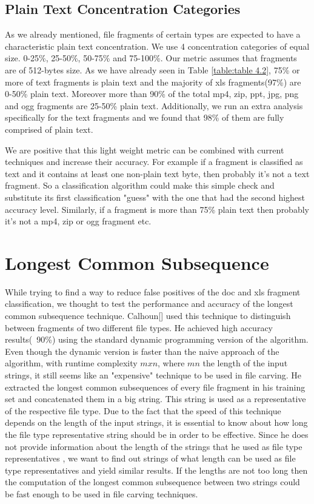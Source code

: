  \subsection{Plain Text Concentration Categories}
As we already mentioned, file fragments of certain types are expected to have a characteristic plain text concentration. We use 4 concentration categories of equal size. 0-25\%, 25-50\%, 50-75\% and 75-100\%. Our metric assumes that fragments are of 512-bytes size. As we have already seen in Table \ref{table:table 4.2}, 75\% or more of text fragments is plain text and the majority of xls fragments(97\%) are 0-50\% plain text. Moreover more than 90\% of the total mp4, zip, ppt, jpg, png and ogg fragments are 25-50\% plain text. Additionally, we run an extra analysis specifically for the text fragments and we found that 98\% of them are fully comprised of plain text.

We are positive that this light weight metric can be combined with current techniques and increase their accuracy. For example if a fragment is classified as text and it contains at least one non-plain text byte, then probably it's not a text fragment. So a classification algorithm could make this simple check and substitute its first classification "guess" with the one that had the second highest accuracy level. Similarly, if a fragment is more than 75\% plain text then probably it's not a mp4, zip or ogg fragment etc.

\section{Longest Common Subsequence}
While trying to find a way to reduce false positives of the doc and xls fragment classification, we thought to test the performance and accuracy of the longest common subsequence technique. Calhoun[] used this technique to distinguish between fragments of two different file types. He achieved high accuracy results(~90\%) using the standard dynamic programming version of the algorithm. Even though the dynamic version is faster than the naive approach of the algorithm, with runtime complexity $mxn$, where $m n $ the length of the input strings, it still seems like an "expensive" technique to be used in file carving. He extracted the longest common subsequences of every file fragment in his training set and concatenated them in a big string. This string is used as a representative of the respective file type.  Due to the fact that the speed of this technique depends on the length of the input strings, it is essential to know about how long the file type representative string should be in order to be effective. Since he does not provide information about the length of the strings that he used as file type representatives , we want to find out strings of what length can be used as file type representatives and yield similar results. If the lengths are not too long then the computation of the longest common subsequence between two strings could be fast enough to be used in file carving techniques.

